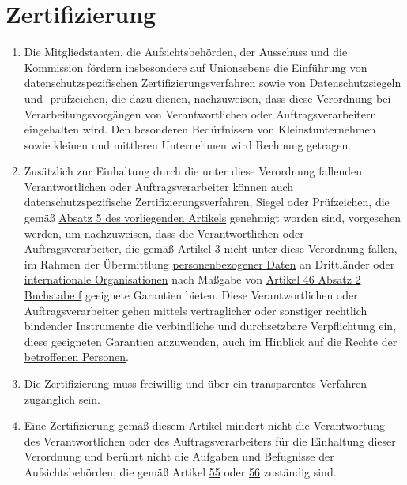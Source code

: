 \chapter{Zertifizierung}
\label{ch:42}


\begin{enumerate}

  \item Die Mitgliedstaaten, die Aufsichtsbehörden, der Ausschuss und die Kommission fördern insbesondere auf
   Unionsebene die Einführung von datenschutzspezifischen Zertifizierungsverfahren sowie von Datenschutzsiegeln
   und -prüfzeichen, die dazu dienen, nachzuweisen, dass diese Verordnung bei Verarbeitungsvorgängen von
   Verantwortlichen oder Auftragsverarbeitern eingehalten wird. Den besonderen Bedürfnissen von Kleinstunternehmen
   sowie kleinen und mittleren Unternehmen wird Rechnung getragen.
  \label{itm:42-1}

  \item Zusätzlich zur Einhaltung durch die unter diese Verordnung fallenden Verantwortlichen oder Auftragsverarbeiter
   können auch datenschutzspezifische Zertifizierungsverfahren, Siegel oder Prüfzeichen, die gemäß \hyperref[itm:42-5]
   {Absatz 5 des vorliegenden Artikels} genehmigt worden sind, vorgesehen werden, um nachzuweisen, dass die
   Verantwortlichen oder Auftragsverarbeiter, die gemäß \hyperref[ch:3]{Artikel 3} nicht unter diese Verordnung
   fallen, im Rahmen der Übermittlung \hyperref[itm:04-1]{personenbezogener Daten} an Drittländer oder \hyperref[itm:04-29]{internationale Organisationen} nach
   Maßgabe von \hyperref[itm:46-2f]{Artikel 46 Absatz 2 Buchstabe f} geeignete Garantien bieten. Diese Verantwortlichen
   oder Auftragsverarbeiter gehen mittels vertraglicher oder sonstiger rechtlich bindender Instrumente die verbindliche
   und durchsetzbare Verpflichtung ein, diese geeigneten Garantien anzuwenden, auch im Hinblick auf die Rechte der
   \hyperref[itm:04-1]{betroffenen Personen}.
  \label{itm:42-2}

  \item Die Zertifizierung muss freiwillig und über ein transparentes Verfahren zugänglich sein.
  \label{itm:42-3}

  \item Eine Zertifizierung gemäß diesem Artikel mindert nicht die Verantwortung des Verantwortlichen oder des
   Auftragsverarbeiters für die Einhaltung dieser Verordnung und berührt nicht die Aufgaben und Befugnisse der
   Aufsichtsbehörden, die gemäß Artikel \hyperref[ch:55]{55} oder \hyperref[ch:56]{56} zuständig sind.
  \label{itm:42-4}


\end{enumerate}
